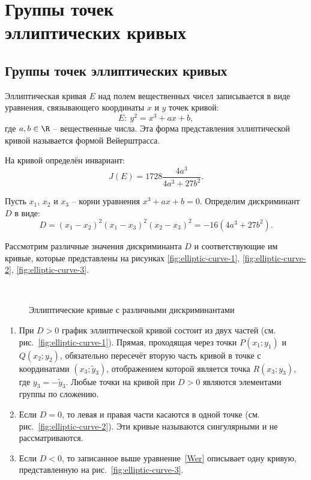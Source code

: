 \section[Группы точек эллиптических кривых]{Группы точек\\
	эллиптических кривых}\label{section-math-ec-groups}

\subsection{Группы точек эллиптических кривых}

Эллиптическая кривая $E$ над полем вещественных чисел записывается в виде уравнения, связывающего координаты $x$ и $y$ точек кривой:
\begin{equation}
    E: ~ y^{2} = x^{3} + ax + b,
    \label{Wer}
\end{equation}
где $a,b \in \R$ -- вещественные числа. Эта форма представления эллиптической кривой называется формой Вейерштрасса.

На кривой определён инвариант:
\begin{equation}
    J(E)=1728\frac{4a^{3} }{4a^{3} +27b^{2} }.
\end{equation}

Пусть $x_{1}$, $x_{2}$ и $x_{3}$ -- корни уравнения $x^3 + a x + b = 0$. Определим дискриминант $D$ в виде:
    \[ D =(x_1 - x_2)^2 (x_1 - x_3)^2 (x_2 - x_3)^2 = - 16(4 a^3 + 27 b^2). \]

Рассмотрим различные значения дискриминанта $D$ и соответствующие им кривые, которые представлены на рисунках \ref{fig:elliptic-curve-1}, \ref{fig:elliptic-curve-2}, \ref{fig:elliptic-curve-3}.

\begin{figure}[thb]
	\centering 
	~~~~
	~~~~
	\caption{Эллиптические кривые с различными дискриминантами}
\end{figure}

\begin{enumerate}
    \item При $D>0$ график эллиптической кривой состоит из двух частей (см. рис.~\ref{fig:elliptic-curve-1}). Прямая, проходящая через точки $P(x_1; y_1)$ и $Q(x_2; y_2)$, обязательно пересечёт вторую часть кривой в точке с координатами $(x_3; \widetilde{y}_3)$, отображением которой является точка $R(x_3; y_3)$, где $y_3 = - \widetilde{y}_3$. Любые точки на кривой при $D>0$ являются элементами группы по сложению.
    \item Если $D=0$, то левая и правая части касаются в одной точке (см. рис.~\ref{fig:elliptic-curve-2}). Эти кривые называются сингулярными и не рассматриваются.
    \item Если $D<0$, то записанное выше уравнение~\ref{Wer} описывает одну кривую, представленную на рис.~\ref{fig:elliptic-curve-3}.
\end{enumerate}

